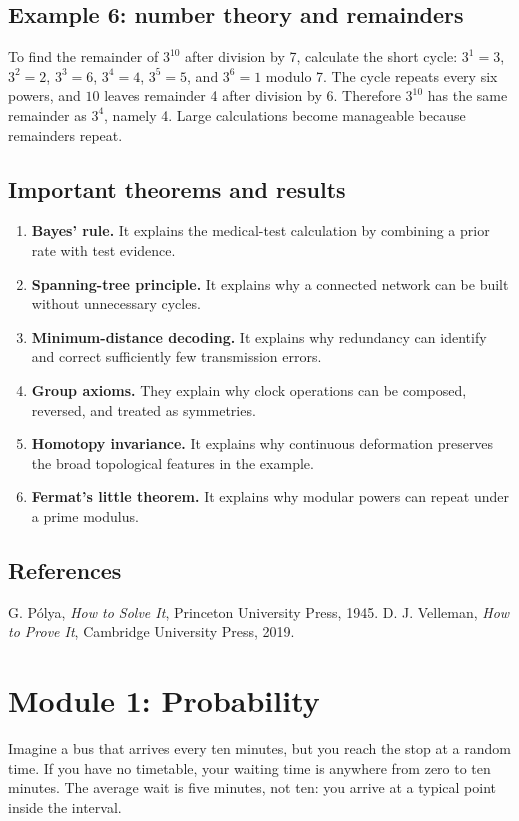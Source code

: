 \documentclass[11pt,oneside]{book}
\makeatletter
\renewenvironment{thebibliography}[1]
  {\list{\@biblabel{\@arabic\c@enumiv}}%
    {\settowidth\labelwidth{\@biblabel{#1}}%
     \leftmargin\labelwidth
     \advance\leftmargin\labelsep
     \usecounter{enumiv}%
     \let\p@enumiv\@empty
     \renewcommand\theenumiv{\@arabic\c@enumiv}}}
  {\endlist}
\makeatother
\begin{document}
\section*{Example 6: number theory and remainders}
To find the remainder of $3^{10}$ after division by 7, calculate the short cycle: $3^1=3$, $3^2=2$, $3^3=6$, $3^4=4$, $3^5=5$, and $3^6=1$ modulo 7. The cycle repeats every six powers, and $10$ leaves remainder 4 after division by 6. Therefore $3^{10}$ has the same remainder as $3^4$, namely 4. Large calculations become manageable because remainders repeat.

\section*{Important theorems and results}
\begin{enumerate}[leftmargin=*,itemsep=0.35em]
\item \textbf{Bayes' rule.} It explains the medical-test calculation by combining a prior rate with test evidence.
\item \textbf{Spanning-tree principle.} It explains why a connected network can be built without unnecessary cycles.
\item \textbf{Minimum-distance decoding.} It explains why redundancy can identify and correct sufficiently few transmission errors.
\item \textbf{Group axioms.} They explain why clock operations can be composed, reversed, and treated as symmetries.
\item \textbf{Homotopy invariance.} It explains why continuous deformation preserves the broad topological features in the example.
\item \textbf{Fermat's little theorem.} It explains why modular powers can repeat under a prime modulus.
\end{enumerate}

\section*{References}
\begin{thebibliography}{9}
 G. P\'olya, \emph{How to Solve It}, Princeton University Press, 1945.
 D. J. Velleman, \emph{How to Prove It}, Cambridge University Press, 2019.
\end{thebibliography}

\chapter[Module 1: Probability]{Module 1: Probability}
Imagine a bus that arrives every ten minutes, but you reach the stop at a random time. If you have no timetable, your waiting time is anywhere from zero to ten minutes. The average wait is five minutes, not ten: you arrive at a typical point inside the interval.
\end{document}
